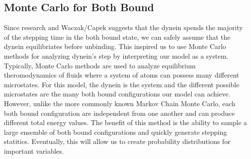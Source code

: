 \subsection{Monte Carlo for Both Bound}
Since research and Waczak/Capek suggests that the dynein spends the majority of the stepping time in the both bound state, we can safely assume that the dynein equilibriates before unbinding. This inspired us to use Monte Carlo methods for analyzing dynein's step by interpreting our model as a system. Typically, Monte Carlo methods are used to analyze equilibrium theromodynamics of fluids where a system of atoms can possess many different microstates. For this model, the dynein is the system and the different possible microstates are the many both bound configurations our model can achieve. However, unlike the more commonly known Markov Chain Monte Carlo, each both bound configuration are independent from one another and can produce different total energy values. The benefit of this method is the ability to sample a large ensemble of both bound configurations and quickly generate stepping statitics. Eventually, this will allow us to create probability distributions for important variables.

